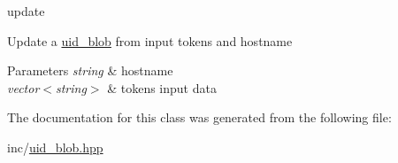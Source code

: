 update 

\-Update a \hyperlink{classclpr__d_1_1uid__blob}{uid\-\_\-blob} from input tokens and hostname 
\begin{DoxyParams}{\-Parameters}
{\em string} & hostname \\
\hline
{\em vector$<$string$>$} & tokens input data \\
\hline
\end{DoxyParams}


\-The documentation for this class was generated from the following file\-:\begin{DoxyCompactItemize}
\item 
inc/\hyperlink{uid__blob_8hpp}{uid\-\_\-blob.\-hpp}\end{DoxyCompactItemize}
